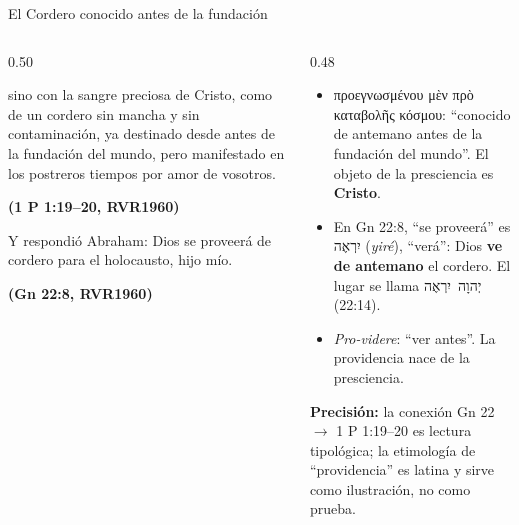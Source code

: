 \documentclass[hyperref={bookmarks=false},aspectratio=169]{beamer}
\newcommand{\heb}[1]{\mbox{\foreignlanguage{hebrew}{#1}}}
\newcommand{\grc}[1]{\foreignlanguage{ancientgreek}{#1}}
\newcommand{\fuente}[1]{\par\hfill{\upshape\bfseries\footnotesize\textcolor{azul}{#1}}}
\newcommand{\destacar}[1]{\textbf{\textcolor{azul}{#1}}}
\newcommand{\precision}[1]{{\footnotesize\color{gris}\textbf{Precisión:} #1}}
\begin{document}
\begin{frame}{El Cordero conocido antes de la fundación}
\begin{columns}[t,onlytextwidth]
\begin{column}{0.50\textwidth}
\begin{cita}sino con la sangre preciosa de Cristo, como de un cordero sin mancha y sin contaminación, ya destinado desde antes de la fundación del mundo, pero manifestado en los postreros tiempos por amor de vosotros.\fuente{(1 P 1:19--20, RVR1960)}\end{cita}
\begin{cita}Y respondió Abraham: Dios se proveerá de cordero para el holocausto, hijo mío.\fuente{(Gn 22:8, RVR1960)}\end{cita}
\end{column}
\begin{column}{0.48\textwidth}\small
\begin{itemize}
\item \grc{προεγνωσμένου μὲν πρὸ καταβολῆς κόσμου}: ``conocido de antemano antes de la fundación del mundo''. El objeto de la presciencia es \destacar{Cristo}.
\item En Gn 22:8, ``se proveerá'' es \heb{יִרְאֶה} (\emph{yiré}), ``verá'': Dios \destacar{ve de antemano} el cordero. El lugar se llama \heb{יְהוָה יִרְאֶה} (22:14).
\item \emph{Pro-videre}: ``ver antes''. La providencia nace de la presciencia.
\end{itemize}
\precision{la conexión Gn 22 $\rightarrow$ 1 P 1:19--20 es lectura tipológica; la etimología de ``providencia'' es latina y sirve como ilustración, no como prueba.}
\end{column}
\end{columns}
\end{frame}
\end{document}
